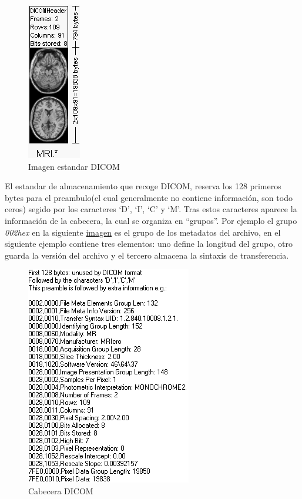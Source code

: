 \begin{figure}[H]
  \centering
    \label{dicom:dummy_image}
    \includegraphics[scale=0.75]{img/dcmi.png}
  \caption{Imagen estandar  DICOM}
\end{figure}

El estandar de almacenamiento que recoge DICOM, reserva los 128 primeros bytes para el preambulo(el cual generalmente no contiene información, son todo ceros) segido por los caracteres `D', `I', `C' y `M'. Tras estos caracteres aparece la información de la cabecera, la cual se organiza en ``grupos''. Por ejemplo el grupo \textit{002hex} en la siguiente \hyperref[dicom:dummy_header]{imagen} es el grupo de los metadatos del archivo, en el siguiente ejemplo contiene tres elementos: uno define la longitud del grupo, otro guarda la versión del archivo y el tercero almacena la sintaxis de transferencia.

\begin{figure}[H]
  \centering
    \includegraphics[scale=0.75]{img/header.png}
  \caption{Cabecera  DICOM}\label{dicom:dummy_header}
\end{figure}

